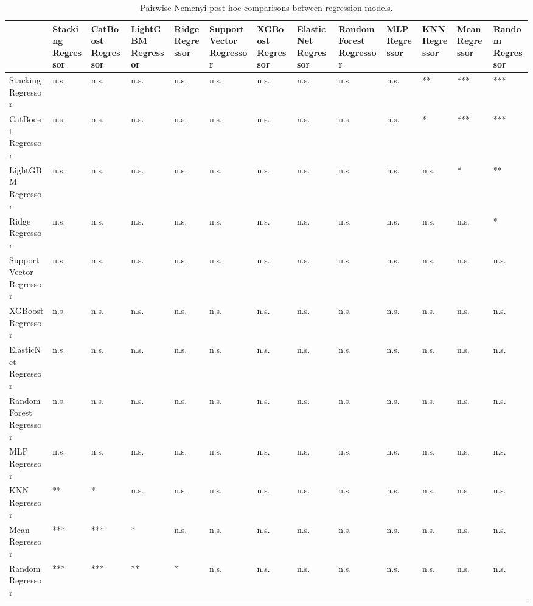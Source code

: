 \begin{table}
\caption{Pairwise Nemenyi post-hoc comparisons between regression models.}
\label{tab:nemenyi_pairwise_significance}
\begin{tabular}{lllllllllllll}
\toprule
 & Stacking Regressor & CatBoost Regressor & LightGBM Regressor & Ridge Regressor & Support Vector Regressor & XGBoost Regressor & ElasticNet Regressor & Random Forest Regressor & MLP Regressor & KNN Regressor & Mean Regressor & Random Regressor \\
\midrule
Stacking Regressor & n.s. & n.s. & n.s. & n.s. & n.s. & n.s. & n.s. & n.s. & n.s. & ** & *** & *** \\
CatBoost Regressor & n.s. & n.s. & n.s. & n.s. & n.s. & n.s. & n.s. & n.s. & n.s. & * & *** & *** \\
LightGBM Regressor & n.s. & n.s. & n.s. & n.s. & n.s. & n.s. & n.s. & n.s. & n.s. & n.s. & * & ** \\
Ridge Regressor & n.s. & n.s. & n.s. & n.s. & n.s. & n.s. & n.s. & n.s. & n.s. & n.s. & n.s. & * \\
Support Vector Regressor & n.s. & n.s. & n.s. & n.s. & n.s. & n.s. & n.s. & n.s. & n.s. & n.s. & n.s. & n.s. \\
XGBoost Regressor & n.s. & n.s. & n.s. & n.s. & n.s. & n.s. & n.s. & n.s. & n.s. & n.s. & n.s. & n.s. \\
ElasticNet Regressor & n.s. & n.s. & n.s. & n.s. & n.s. & n.s. & n.s. & n.s. & n.s. & n.s. & n.s. & n.s. \\
Random Forest Regressor & n.s. & n.s. & n.s. & n.s. & n.s. & n.s. & n.s. & n.s. & n.s. & n.s. & n.s. & n.s. \\
MLP Regressor & n.s. & n.s. & n.s. & n.s. & n.s. & n.s. & n.s. & n.s. & n.s. & n.s. & n.s. & n.s. \\
KNN Regressor & ** & * & n.s. & n.s. & n.s. & n.s. & n.s. & n.s. & n.s. & n.s. & n.s. & n.s. \\
Mean Regressor & *** & *** & * & n.s. & n.s. & n.s. & n.s. & n.s. & n.s. & n.s. & n.s. & n.s. \\
Random Regressor & *** & *** & ** & * & n.s. & n.s. & n.s. & n.s. & n.s. & n.s. & n.s. & n.s. \\
\bottomrule
\end{tabular}
\end{table}
